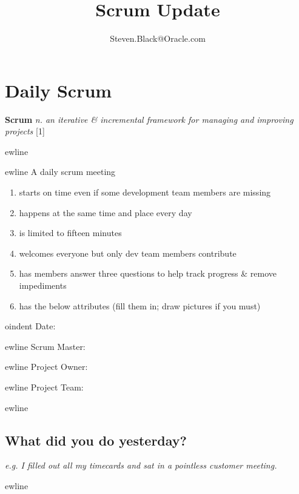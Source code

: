\documentclass[12pt]{article}%
\begin{document}
\title{Scrum Update}
\author{Steven.Black@Oracle.com}
\maketitle

\section{Daily Scrum}
\textbf{Scrum} 
\textit{n. an iterative \& incremental framework for managing and improving projects} 
[1]

ewline 

ewline 
A daily scrum meeting
\begin{enumerate}[nosep, label=\textendash]
	\item starts on time even if some development team members are missing
    \item happens at the same time and place every day
    \item is limited to fifteen minutes 
    \item welcomes everyone but only dev team members contribute
    \item has members answer three questions to help track progress \& remove impediments
    \item has the below attributes (fill them in; draw pictures if you must)
\end{enumerate}
\hfill


oindent
Date: \hspace{18mm} \underline{\hspace{3cm}}

ewline
Scrum Master: \hspace{3mm} \underline{\hspace{3cm}}

ewline
Project Owner: \hspace{2mm} \underline{\hspace{3cm}}

ewline
Project Team: \hspace{4mm} \underline{\hspace{3cm}}

ewline


\subsection{What did you do yesterday?}
\textit{e.g. I filled out all my timecards and sat in a pointless customer meeting.}

ewline 
\end{document}
